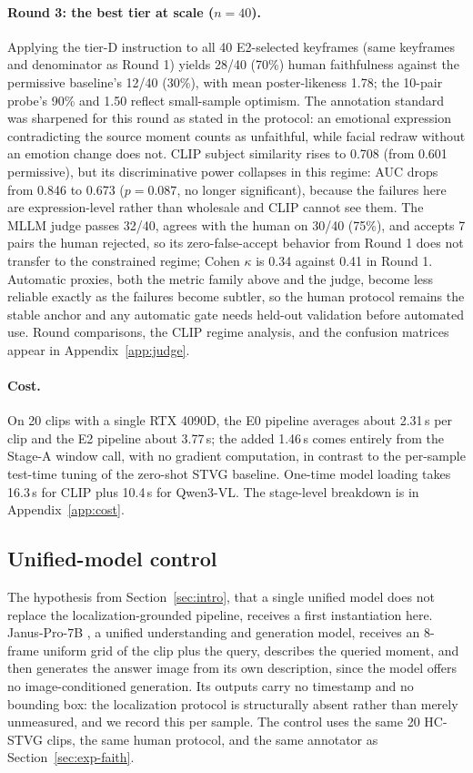 \paragraph{Round 3: the best tier at scale ($n=40$).}
Applying the tier-D instruction to all 40 E2-selected keyframes (same keyframes and denominator as Round 1) yields 28/40 (70\%) human faithfulness against the permissive baseline's 12/40 (30\%), with mean poster-likeness 1.78; the 10-pair probe's 90\% and 1.50 reflect small-sample optimism. The annotation standard was sharpened for this round as stated in the protocol: an emotional expression contradicting the source moment counts as unfaithful, while facial redraw without an emotion change does not. CLIP subject similarity rises to 0.708 (from 0.601 permissive), but its discriminative power collapses in this regime: AUC drops from 0.846 to 0.673 ($p=0.087$, no longer significant), because the failures here are expression-level rather than wholesale and CLIP cannot see them. The MLLM judge passes 32/40, agrees with the human on 30/40 (75\%), and accepts 7 pairs the human rejected, so its zero-false-accept behavior from Round 1 does not transfer to the constrained regime; Cohen $\kappa$ is 0.34 against 0.41 in Round 1. Automatic proxies, both the metric family above and the judge, become less reliable exactly as the failures become subtler, so the human protocol remains the stable anchor and any automatic gate needs held-out validation before automated use. Round comparisons, the CLIP regime analysis, and the confusion matrices appear in Appendix~\ref{app:judge}.

\paragraph{Cost.}
On 20 clips with a single RTX 4090D, the E0 pipeline averages about 2.31\,s per clip and the E2 pipeline about 3.77\,s; the added 1.46\,s comes entirely from the Stage-A window call, with no gradient computation, in contrast to the per-sample test-time tuning of the zero-shot STVG baseline. One-time model loading takes 16.3\,s for CLIP plus 10.4\,s for Qwen3-VL. The stage-level breakdown is in Appendix~\ref{app:cost}.

\subsection{Unified-model control}\label{sec:exp-unified}

The hypothesis from Section~\ref{sec:intro}, that a single unified model does not replace the localization-grounded pipeline, receives a first instantiation here. Janus-Pro-7B \citep{januspro2501}, a unified understanding and generation model, receives an 8-frame uniform grid of the clip plus the query, describes the queried moment, and then generates the answer image from its own description, since the model offers no image-conditioned generation. Its outputs carry no timestamp and no bounding box: the localization protocol is structurally absent rather than merely unmeasured, and we record this per sample. The control uses the same 20 HC-STVG clips, the same human protocol, and the same annotator as Section~\ref{sec:exp-faith}.

